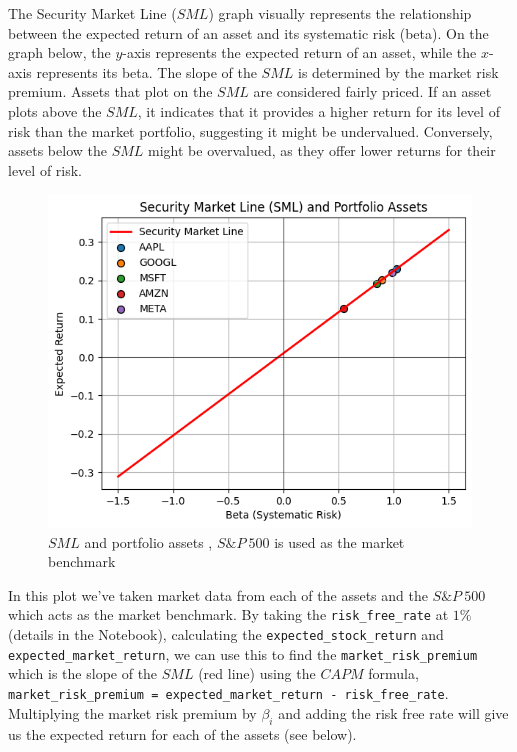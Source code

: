 \documentclass[a4paper,12pt,titlepage]{article}
\numberwithin{equation}{section}
\begin{document}
The Security Market Line ($SML$) graph visually represents the relationship between the expected return of an 
asset and its systematic risk (beta). On the graph below, the $y$-axis represents the expected return of an 
asset, while the $x$-axis represents its beta. The slope of the $SML$ is determined by the market risk premium. 
Assets that plot on the $SML$ are considered fairly priced. If an asset plots above the $SML$, it indicates that 
it provides a higher return for its level of risk than the market portfolio, suggesting it might be 
undervalued. Conversely, assets below the $SML$ might be overvalued, as they offer lower returns for their 
level of risk.

\begin{figure}[htbp] %
	\centering
	\includegraphics[width=0.8\linewidth,keepaspectratio]{Plots/SML.png}
	\caption{$SML$ and portfolio assets , $S\&P ~ 500$ is used as the market benchmark}
	\label{fig:figure4}
  \end{figure}

\par \noindent In this plot we've taken market data from each of the assets and the $S\&P ~ 500$ which acts as the market benchmark. 
By taking the \texttt{risk\_free\_rate} at $1\%$ (details in the Notebook), calculating the \texttt{expected\_stock\_return} and 
\texttt{expected\_market\_return}, we can use this to find the \texttt{market\_risk\_premium} which is the slope of the $SML$ (red line)
using the $CAPM$ formula, \texttt{market\_risk\_premium = expected\_market\_return - risk\_free\_rate}. Multiplying the market risk 
premium by $\beta_{i}$ and adding the risk free rate will give us the expected return for each of the assets (see below).
\end{document}

